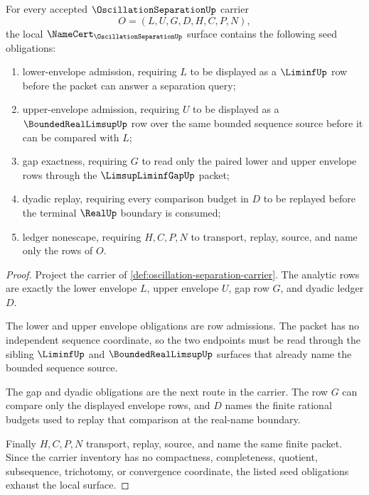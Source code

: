 \begin{theorem}
\label{thm:oscillation-separation-seed-obligations}
For every accepted $\OscillationSeparationUp$ carrier
$$
O=(L,U,G,D,H,C,P,N),
$$
the local $\NameCert_{\OscillationSeparationUp}$ surface contains the following seed obligations:
\begin{enumerate}
\item lower-envelope admission, requiring $L$ to be displayed as a $\LiminfUp$ row before the packet can answer a separation query;
\item upper-envelope admission, requiring $U$ to be displayed as a $\BoundedRealLimsupUp$ row over the same bounded sequence source before it can be compared with $L$;
\item gap exactness, requiring $G$ to read only the paired lower and upper envelope rows through the $\LimsupLiminfGapUp$ packet;
\item dyadic replay, requiring every comparison budget in $D$ to be replayed before the terminal $\RealUp$ boundary is consumed;
\item ledger nonescape, requiring $H,C,P,N$ to transport, replay, source, and name only the rows of $O$.
\end{enumerate}
\end{theorem}
\begin{proof}
Project the carrier of \autoref{def:oscillation-separation-carrier}. The analytic rows are exactly the lower envelope $L$, upper envelope $U$, gap row $G$, and dyadic ledger $D$.

The lower and upper envelope obligations are row admissions. The packet has no independent sequence coordinate, so the two endpoints must be read through the sibling $\LiminfUp$ and $\BoundedRealLimsupUp$ surfaces that already name the bounded sequence source.

The gap and dyadic obligations are the next route in the carrier. The row $G$ can compare only the displayed envelope rows, and $D$ names the finite rational budgets used to replay that comparison at the real-name boundary.

Finally $H,C,P,N$ transport, replay, source, and name the same finite packet. Since the carrier inventory has no compactness, completeness, quotient, subsequence, trichotomy, or convergence coordinate, the listed seed obligations exhaust the local surface.
\end{proof}

